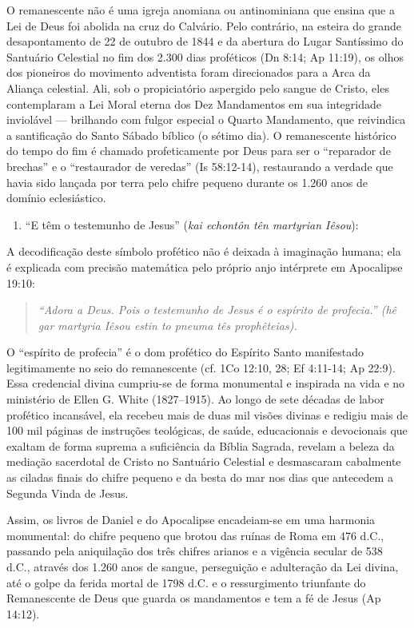 \documentclass[11pt,a4paper,openany]{book}
\begin{document}
O remanescente não é uma igreja anomiana ou antinominiana que ensina que a Lei de Deus foi abolida na cruz do Calvário. Pelo contrário, na esteira do grande desapontamento de 22 de outubro de 1844 e da abertura do Lugar Santíssimo do Santuário Celestial no fim dos 2.300 dias proféticos (Dn 8:14; Ap 11:19), os olhos dos pioneiros do movimento adventista foram direcionados para a Arca da Aliança celestial. Ali, sob o propiciatório aspergido pelo sangue de Cristo, eles contemplaram a Lei Moral eterna dos Dez Mandamentos em sua integridade inviolável — brilhando com fulgor especial o Quarto Mandamento, que reivindica a santificação do Santo Sábado bíblico (o sétimo dia). O remanescente histórico do tempo do fim é chamado profeticamente por Deus para ser o ``reparador de brechas'' e o ``restaurador de veredas'' (Is 58:12-14), restaurando a verdade que havia sido lançada por terra pelo chifre pequeno durante os 1.260 anos de domínio eclesiástico.

\begin{enumerate}
  \item ``E têm o testemunho de Jesus'' (\textit{kai echontôn tên martyrian Iêsou}):
\end{enumerate}

A decodificação deste símbolo profético não é deixada à imaginação humana; ela é explicada com precisão matemática pelo próprio anjo intérprete em Apocalipse 19:10:

\begin{quote}
\itshape ``Adora a Deus. Pois o testemunho de Jesus é o espírito de profecia.'' (\textit{hê gar martyria Iêsou estin to pneuma tês prophêteias}).
\end{quote}

O ``espírito de profecia'' é o dom profético do Espírito Santo manifestado legitimamente no seio do remanescente (cf. 1Co 12:10, 28; Ef 4:11-14; Ap 22:9). Essa credencial divina cumpriu-se de forma monumental e inspirada na vida e no ministério de Ellen G. White (1827–1915). Ao longo de sete décadas de labor profético incansável, ela recebeu mais de duas mil visões divinas e redigiu mais de 100 mil páginas de instruções teológicas, de saúde, educacionais e devocionais que exaltam de forma suprema a suficiência da Bíblia Sagrada, revelam a beleza da mediação sacerdotal de Cristo no Santuário Celestial e desmascaram cabalmente as ciladas finais do chifre pequeno e da besta do mar nos dias que antecedem a Segunda Vinda de Jesus.

Assim, os livros de Daniel e do Apocalipse encadeiam-se em uma harmonia monumental: do chifre pequeno que brotou das ruínas de Roma em 476 d.C., passando pela aniquilação dos três chifres arianos e a vigência secular de 538 d.C., através dos 1.260 anos de sangue, perseguição e adulteração da Lei divina, até o golpe da ferida mortal de 1798 d.C. e o ressurgimento triunfante do Remanescente de Deus que guarda os mandamentos e tem a fé de Jesus (Ap 14:12).
\end{document}
